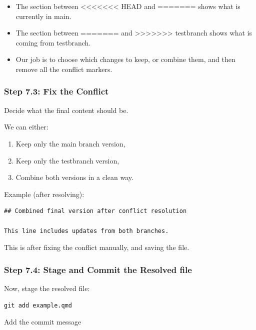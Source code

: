 \documentclass[
  11pt,
  a4paper,
]{article}
\begin{document}
\begin{itemize}
\item
  The section between
  \textless\textless\textless\textless\textless\textless\textless{} HEAD
  and ======= shows what is currently in main.
\item
  The section between ======= and
  \textgreater\textgreater\textgreater\textgreater\textgreater\textgreater\textgreater{}
  testbranch shows what is coming from testbranch.
\item
  Our job is to choose which changes to keep, or combine them, and then
  remove all the conflict markers.
\end{itemize}

\subsubsection{Step 7.3: Fix the
Conflict}\label{step-7.3-fix-the-conflict}

Decide what the final content should be.

We can either:

\begin{enumerate}
\def\labelenumi{\arabic{enumi}.}
\item
  Keep only the main branch version,
\item
  Keep only the testbranch version,
\item
  Combine both versions in a clean way.
\end{enumerate}

Example (after resolving):

\begin{verbatim}
## Combined final version after conflict resolution

This line includes updates from both branches.
\end{verbatim}

This is after fixing the conflict manually, and saving the file.

\subsubsection{Step 7.4: Stage and Commit the Resolved
file}\label{step-7.4-stage-and-commit-the-resolved-file}

Now, stage the resolved file:

\begin{verbatim}
git add example.qmd 
\end{verbatim}

Add the commit message
\end{document}

